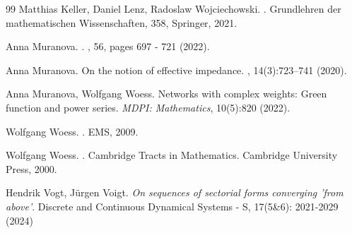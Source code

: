 \documentclass[a4paper,11pt]{amsart}
\theoremstyle{definition}
\begin{document}
\begin{thebibliography}{99}
Matthias Keller, Daniel Lenz, Radoslaw Wojciechowski. 
. Grundlehren der mathematischen Wissenschaften, 358, Springer, 2021.




 Anna Muranova.  
. 
, 56, pages 697 - 721 (2022).


Anna Muranova.
\newblock On the notion of effective impedance.
, 14(3):723--741 (2020).

%


Anna Muranova, Wolfgang Woess. Networks with complex weights: Green function and power series. {\em MDPI: Mathematics}, 10(5):820 (2022).



 Wolfgang Woess. 
.
\newblock EMS, 2009.


Wolfgang Woess.
.
\newblock Cambridge Tracts in Mathematics. Cambridge University Press, 2000.




Hendrik Vogt, Jürgen Voigt. {\em On sequences of sectorial forms converging 'from above'}. Discrete and Continuous Dynamical Systems - S, 17(5\&6): 2021-2029 (2024)





\end{thebibliography}
\end{document}
